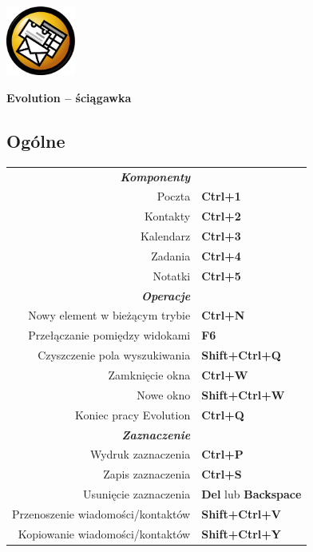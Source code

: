 \documentclass[12pt]{article}
\date {}
\begin{document}
	\begin{landscape}


	\begin{center}
	\begin{minipage}[m]
		{1in}\includegraphics[height=0.9in]{../evolution-logo.eps}\hspace{5mm}
	\end{minipage}
	\hspace{5mm}
	\textbf{\Huge{Evolution -- ściągawka}}
	\end{center}

	\begin{center}
	\begin{multicols}{2}
	\section*{Ogólne}
	\begin{tabular*}{4in}{rp{1.5in}}
		\textit{\textbf{Komponenty}}		&					\\
		Poczta					& \textbf{Ctrl+1}			\\
		Kontakty				& \textbf{Ctrl+2}			\\
		Kalendarz				& \textbf{Ctrl+3}			\\
		Zadania					& \textbf{Ctrl+4}			\\
		\vspace{1.5mm}
		Notatki					& \textbf{Ctrl+5}			\\
		\textit{\textbf{Operacje}}		&					\\
		Nowy element w bieżącym trybie		& \textbf{Ctrl+N}			\\
		Przełączanie pomiędzy widokami		& \textbf{F6}				\\
		Czyszczenie pola wyszukiwania		& \textbf{Shift+Ctrl+Q}			\\
		Zamknięcie okna				& \textbf{Ctrl+W}			\\
		Nowe okno				& \textbf{Shift+Ctrl+W}			\\
		\vspace{1.5mm}
		Koniec pracy Evolution			& \textbf{Ctrl+Q}			\\
		\textit{\textbf{Zaznaczenie}}		&					\\
		Wydruk zaznaczenia			& \textbf{Ctrl+P}			\\
		Zapis zaznaczenia			& \textbf{Ctrl+S}			\\
		Usunięcie zaznaczenia			& \textbf{Del} lub \textbf{Backspace}	\\
		Przenoszenie wiadomości/kontaktów	& \textbf{Shift+Ctrl+V}			\\
		Kopiowanie wiadomości/kontaktów		& \textbf{Shift+Ctrl+Y}			\\
	\end{tabular*}

\end{multicols}
\end{center}
\end{landscape}
\end{document}
